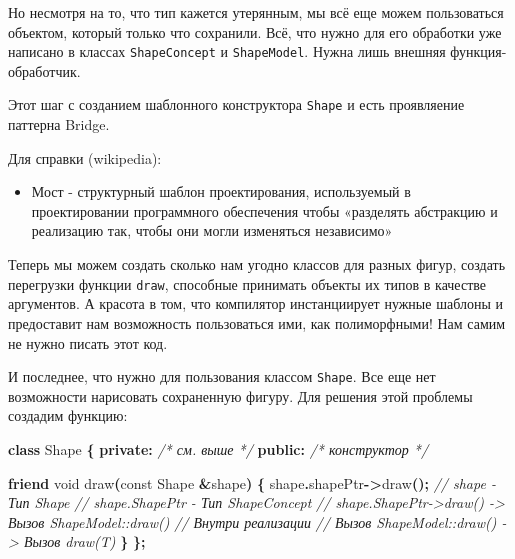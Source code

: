 \documentclass[14pt,a4paper]{article}
\providecommand{\tightlist}{%
	\setlength{\itemsep}{0pt}\setlength{\parskip}{0pt}}
\newenvironment{Shaded}{\begin{paragraph}}{\end{paragraph}}
\newenvironment{Highlighting}{\begin{paragraph}}{\end{paragraph}}
\newcommand{\KeywordTok}[1]{\textcolor[rgb]{0.13,0.29,0.53}{\textbf{#1}}}
\newcommand{\DataTypeTok}[1]{\textcolor[rgb]{0.13,0.29,0.53}{#1}}
\newcommand{\CommentTok}[1]{\textcolor[rgb]{0.56,0.35,0.01}{\textit{#1}}}
\newcommand{\OperatorTok}[1]{\textcolor[rgb]{0.81,0.36,0.00}{\textbf{#1}}}
\newcommand{\AttributeTok}[1]{\textcolor[rgb]{0.77,0.63,0.00}{#1}}
\newcommand{\NormalTok}[1]{#1}
\begin{document}
Но несмотря на то, что тип кажется утерянным, мы всё еще можем
пользоваться объектом, который только что сохранили. Всё, что нужно для
его обработки уже написано в классах \texttt{ShapeConcept} и
\texttt{ShapeModel}. Нужна лишь внешняя функция-обработчик.

Этот шаг с созданием шаблонного конструктора \texttt{Shape} и есть
проявляение паттерна Bridge.

Для справки (wikipedia):

\begin{itemize}
\tightlist
\item
  Мост - структурный шаблон проектирования, используемый в
  проектировании программного обеспечения чтобы «разделять абстракцию и
  реализацию так, чтобы они могли изменяться независимо»
\end{itemize}

Теперь мы можем создать сколько нам угодно классов для разных фигур,
создать перегрузки функции \texttt{draw}, способные принимать объекты их
типов в качестве аргументов. А красота в том, что компилятор
инстанциирует нужные шаблоны и предоставит нам возможность пользоваться
ими, как полиморфными! Нам самим не нужно писать этот код.

И последнее, что нужно для пользования классом \texttt{Shape}. Все еще
нет возможности нарисовать сохраненную фигуру. Для решения этой проблемы
создадим функцию:

\begin{Shaded}
\begin{Highlighting}[]
\KeywordTok{class}\NormalTok{ Shape }\OperatorTok{\{}
\KeywordTok{private}\OperatorTok{:}
    \CommentTok{/* см. выше */}
\KeywordTok{public}\OperatorTok{:}
    \CommentTok{/* конструктор */}
    
    \KeywordTok{friend} \DataTypeTok{void}\NormalTok{ draw}\OperatorTok{(}\AttributeTok{const}\NormalTok{ Shape }\OperatorTok{\&}\NormalTok{shape}\OperatorTok{)} \OperatorTok{\{}
\NormalTok{        shape}\OperatorTok{.}\NormalTok{shapePtr}\OperatorTok{{-}\textgreater{}}\NormalTok{draw}\OperatorTok{();}
        \CommentTok{// shape                    {-}  Тип Shape}
        \CommentTok{// shape.ShapePtr           {-}  Тип ShapeConcept}
        \CommentTok{// shape.ShapePtr{-}\textgreater{}draw()   {-}\textgreater{} Вызов ShapeModel::draw()}
        \CommentTok{// Внутри реализации}
        \CommentTok{// Вызов ShapeModel::draw() {-}\textgreater{} Вызов draw(T)}
    \OperatorTok{\}}
\OperatorTok{\};}
\end{Highlighting}
\end{Shaded}
\end{document}
